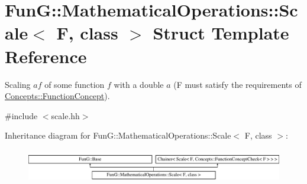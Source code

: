 \hypertarget{structFunG_1_1MathematicalOperations_1_1Scale}{\section{Fun\-G\-:\-:Mathematical\-Operations\-:\-:Scale$<$ F, class $>$ Struct Template Reference}
\label{structFunG_1_1MathematicalOperations_1_1Scale}
}


Scaling $ af $ of some function $ f $ with a double $ a $ (F must satisfy the requirements of \hyperlink{structFunG_1_1Concepts_1_1FunctionConcept}{Concepts\-::\-Function\-Concept}).  




{\ttfamily \#include $<$scale.\-hh$>$}

Inheritance diagram for Fun\-G\-:\-:Mathematical\-Operations\-:\-:Scale$<$ F, class $>$\-:\begin{figure}[H]
\begin{center}
\leavevmode
\includegraphics[height=1.454545cm]{structFunG_1_1MathematicalOperations_1_1Scale}
\end{center}
\end{figure}
